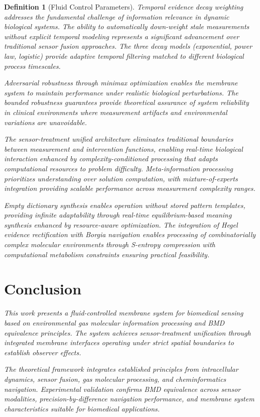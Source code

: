 \documentclass[12pt,a4paper]{article}
\newtheorem{definition}{Definition}
\begin{document}
\begin{definition}[Fluid Control Parameters]
Temporal evidence decay weighting addresses the fundamental challenge of information relevance in dynamic biological systems. The ability to automatically down-weight stale measurements without explicit temporal modeling represents a significant advancement over traditional sensor fusion approaches. The three decay models (exponential, power law, logistic) provide adaptive temporal filtering matched to different biological process timescales.

Adversarial robustness through minimax optimization enables the membrane system to maintain performance under realistic biological perturbations. The bounded robustness guarantees provide theoretical assurance of system reliability in clinical environments where measurement artifacts and environmental variations are unavoidable.

The sensor-treatment unified architecture eliminates traditional boundaries between measurement and intervention functions, enabling real-time biological interaction enhanced by complexity-conditioned processing that adapts computational resources to problem difficulty. Meta-information processing prioritizes understanding over solution computation, with mixture-of-experts integration providing scalable performance across measurement complexity ranges.

Empty dictionary synthesis enables operation without stored pattern templates, providing infinite adaptability through real-time equilibrium-based meaning synthesis enhanced by resource-aware optimization. The integration of Hegel evidence rectification with Borgia navigation enables processing of combinatorially complex molecular environments through S-entropy compression with computational metabolism constraints ensuring practical feasibility.

\section{Conclusion}

This work presents a fluid-controlled membrane system for biomedical sensing based on environmental gas molecular information processing and BMD equivalence principles. The system achieves sensor-treatment unification through integrated membrane interfaces operating under strict spatial boundaries to establish observer effects.

The theoretical framework integrates established principles from intracellular dynamics, sensor fusion, gas molecular processing, and cheminformatics navigation. Experimental validation confirms BMD equivalence across sensor modalities, precision-by-difference navigation performance, and membrane system characteristics suitable for biomedical applications.


\end{definition}
\end{document}
